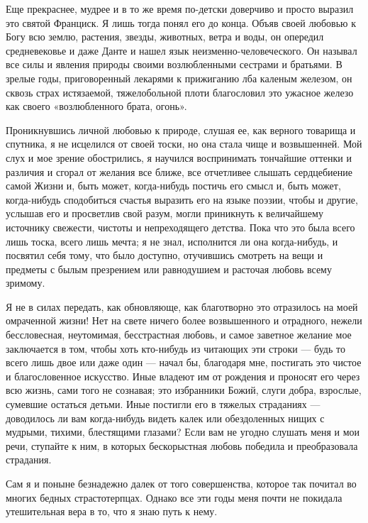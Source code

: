 Еще  прекраснее,  мудрее  и  в  то  же  время  по-детски  доверчиво  и
просто  выразил  это  святой  Франциск.  Я лишь  тогда  понял  его  до
конца.  Объяв  своей  любовью  к Богу  всю  землю,  растения,  звезды,
животных,  ветра и  воды, он  опередил  средневековье и  даже Данте  и
нашел  язык неизменно-человеческого.  Он  называл все  силы и  явления
природы  своими  возлюбленными сестрами  и  братьями.  В зрелые  годы,
приговоренный  лекарями к  прижиганию лба  каленым железом,  он сквозь
страх истязаемой,  тяжелобольной плоти благословил это  ужасное железо
как своего «возлюбленного брата, огонь».

Проникнувшись  личной  любовью  к  природе,  слушая  ее,  как  верного
товарища  и спутника,  я не  исцелился от  своей тоски,  но она  стала
чище  и возвышенней.  Мой слух  и мое  зрение обострились,  я научился
воспринимать  тончайшие оттенки  и различия  и сгорал  от желания  все
ближе,  все  отчетливее  слышать  сердцебиение  самой  Жизни  и,  быть
может,  когда-нибудь постичь  его  смысл и,  быть может,  когда-нибудь
сподобиться  счастья выразить  его на  языке поэзии,  чтобы и  другие,
услышав его  и просветлив свой  разум, могли приникнуть  к величайшему
источнику свежести, чистоты и непреходящего детства. Пока что это была
всего  лишь тоска,  всего лишь  мечта; я  не знал,  исполнится ли  она
когда-нибудь,  и посвятил  себя  тому, что  было доступно,  отучившись
смотреть  на вещи  и предметы  с  былым презрением  или равнодушием  и
расточая любовь всему зримому.

Я не в силах передать,  как обновляюще, как благотворно это отразилось
на моей  омраченной жизни!  Нет на свете  ничего более  возвышенного и
отрадного,  нежели бессловесная,  неутомимая,  бесстрастная любовь,  и
самое заветное желание мое заключается в том, чтобы хоть кто-нибудь из
читающих эти  строки ---  будь то  всего лишь двое  или даже  один ---
начал  бы,  благодаря  мне,  постигать  это  чистое  и  благословенное
искусство. Иные владеют им от рождения и проносят его через всю жизнь,
сами того  не сознавая; это  избранники Божий, слуги  добра, взрослые,
сумевшие остаться детьми.  Иные постигли его в  тяжелых страданиях ---
доводилось ли вам  когда-нибудь видеть калек или  обездоленных нищих с
мудрыми, тихими, блестящими глазами? Если вам не угодно слушать меня и
мои речи,  ступайте к  ним, в которых  бескорыстная любовь  победила и
преобразовала страдания.

Сам  я и  поныне безнадежно  далек от  того совершенства,  которое так
почитал  во многих  бедных страстотерпцах.  Однако все  эти годы  меня
почти не покидала утешительная вера в то, что я знаю путь к нему.

